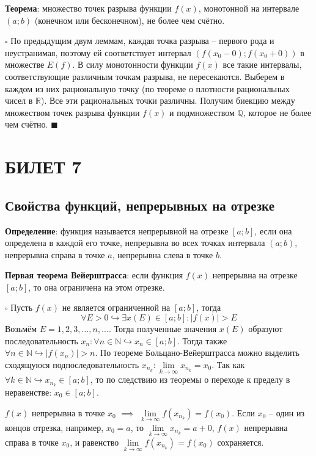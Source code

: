\documentclass[12pt, a4paper, reqno]{article}
\begin{document}
    \textbf{Теорема}: множество точек разрыва функции $f(x)$, монотонной на интервале $(a; b)$
    (конечном или бесконечном), не более чем счётно.

    $\square$ По предыдущим двум леммам, каждая точка разрыва -- первого рода и неустранимая, поэтому
    ей соответствует интервал $(f(x_0 - 0); f(x_0 + 0))$ в множестве $E(f)$. В силу монотонности
    функции $f(x)$ все такие интервалы, соответствующие различным точкам разрыва, не пересекаются.
    Выберем в каждом из них рациональную точку (по теореме о плотности рациональных чисел в
    $\mathbb{R}$). Все эти рациональных точки различны. Получим биекцию между множеством точек
    разрыва функции $f(x)$ и подмножеством $\mathbb{Q}$, которое не более чем счётно. $\blacksquare$

\newpage
\section{БИЛЕТ 7}

\subsection{Свойства функций, непрерывных на отрезке}

    \textbf{Определение}: функция называется непрерывной на отрезке $[a; b]$, если она определена в
    каждой его точке, непрерывна во всех точках интервала $(a; b)$, непрерывна справа в точке $a$,
    непрерывна слева в точке $b$.

    \textbf{Первая теорема Вейерштрасса}: если функция $f(x)$ непрерывна на отрезке $[a; b]$, то она
    ограничена на этом отрезке.

    $\square$ Пусть $f(x)$ не является ограниченной на $[a; b]$, тогда
    \begin{equation*}
        \forall E > 0\hookrightarrow \exists x(E)\in[a; b]: |f(x)| > E
    \end{equation*}
    Возьмём $E = 1, 2, 3, ..., n, ...$. Тогда полученные значения $x(E)$ образуют последовательность
    $x_n: \forall n\in\mathbb{N}\hookrightarrow x_n\in[a; b]$. Тогда также
    $\forall n\in\mathbb{N}\hookrightarrow |f(x_n)| > n$. По теореме Больцано-Вейерштрасса можно
    выделить сходящуюся подпоследовательность $x_{n_k}: \lim\limits_{k\to\infty} x_{n_k} = x_0$. Так
    как $\forall k\in\mathbb{N}\hookrightarrow x_{n_k}\in[a; b]$, то по следствию из теоремы о
    переходе к пределу в неравенстве: $x_0\in[a; b]$.

    $f(x)$ непрерывна в точке $x_0$ $\implies$ $\lim\limits_{k\to\infty} f(x_{n_k}) = f(x_0)$. Если
    $x_0$ -- один из концов отрезка, например, $x_0 = a$, то
    $\lim\limits_{k\to\infty} x_{n_k} = a + 0$, $f(x)$ непрерывна справа в точке $x_0$, и равенство
    $\lim\limits_{k\to\infty} f(x_{n_k}) = f(x_0)$ сохраняется.
\end{document}
